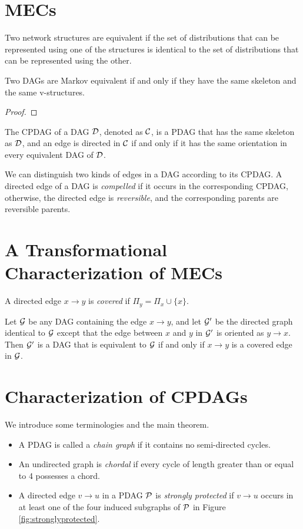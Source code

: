 \section{MECs}

Two network structures are equivalent if the set of distributions that can be represented using one of the structures is identical to the set of distributions that can be represented using the other.
\begin{theorem}\label{thm:verma}
    Two DAGs are Markov equivalent if and only if they have the same skeleton and the same v-structures.
\end{theorem}
\begin{proof}
    
\end{proof}


\begin{definition}[CPDAG]
    The CPDAG of a DAG $\mathcal{D}$, denoted as $\mathcal{C}$, is a PDAG that has the same skeleton as $\mathcal{D}$, and an edge is directed in $\mathcal{C}$ if and only if it has the same orientation in every equivalent DAG of $\mathcal{D}$.
\end{definition}
We can distinguish two kinds of edges in a DAG according to its CPDAG. A directed edge of a DAG is \textit{compelled} if it occurs in the corresponding CPDAG, otherwise, the directed edge is \textit{reversible}, and the corresponding parents are reversible parents.

\section{A Transformational Characterization of MECs}
\begin{definition}
    A directed edge $x\rightarrow y$ is \textit{covered} if $\Pi_{y}=\Pi_{x}\cup\{x\}$.
\end{definition}

\begin{theorem}\label{thm:transformational}
    Let $\mathcal{G}$ be any DAG containing the edge $x \rightarrow y$, and let $\mathcal{G}'$ be the directed graph identical to $\mathcal{G}$ except that the edge between $x$ and $y$ in $\mathcal{G}'$ is oriented as $y\rightarrow x$. Then $\mathcal{G}'$ is a DAG that is equivalent to $\mathcal{G}$ if and only if $x\rightarrow y$ is a covered edge in $\mathcal{G}$.
\end{theorem}


\section{Characterization of CPDAGs}
We introduce some terminologies and the main theorem.
\begin{itemize}
    \item A PDAG is called a \textit{chain graph} if it contains no semi-directed cycles.
    \item An undirected graph is \textit{chordal} if every cycle of length greater than or equal to 4 possesses a chord.
    \item A directed edge $v\rightarrow u$ in a PDAG $\mathcal{P}$ is \textit{strongly protected} if $v\rightarrow u$ occurs in at least one of the four induced subgraphs of $\mathcal{P}$ in Figure \ref{fig:stronglyprotected}.
\end{itemize}

